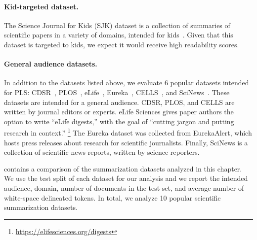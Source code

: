 \paragraph{Kid-targeted dataset.} The Science Journal for Kids (SJK) dataset is a collection of summaries of scientific papers in a variety of domains, intended for kids~\cite{BioLaySumm_2024}. 
Given that this dataset is targeted to kids, we expect it would receive high readability scores.


\paragraph{General audience datasets.} In addition to the datasets listed above, we evaluate 6 popular datasets intended for PLS: CDSR~\cite{Guo2020AutomatedLL}, PLOS~\cite{goldsack2022making}, eLife~\cite{goldsack2022making}, Eureka~\cite{Zaman2020HTSSAN},  CELLS~\cite{Guo2022RetrievalAO}, and SciNews~\cite{pu-etal-2024-scinews}. These datasets are intended for a general audience. CDSR, PLOS, and CELLS are written by journal editors or experts. eLife Sciences gives paper authors the option to write ``eLife digests,'' with the goal of ``cutting jargon and putting research in context.''
\footnote{\url{https://elifesciences.org/digests}} 
The Eureka dataset was collected from EurekaAlert, which hosts press releases about research for scientific journalists.
Finally, SciNews is a collection of scientific news reports, written by science reporters.


 contains a comparison of the summarization datasets analyzed in this chapter. We use the test split of each dataset for our analysis and we report the intended audience, domain, number of documents in the test set, and average number of white-space delineated tokens.
In total, we analyze 10 popular scientific summarization datasets. 



